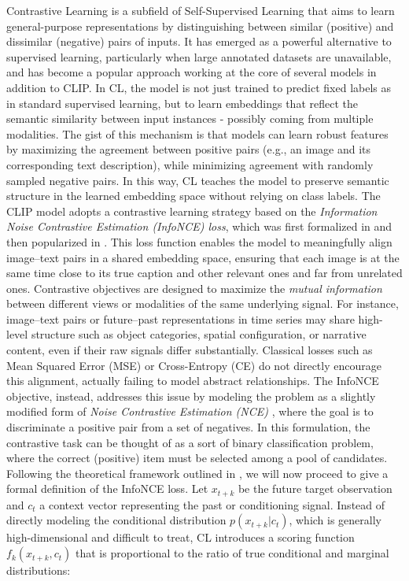 \documentclass[a4paper, twoside, english]{sapthesis} %
\begin{document}
Contrastive Learning is a subfield of Self-Supervised Learning that aims to learn general-purpose representations by distinguishing between similar (positive) and dissimilar (negative) pairs of inputs. It has emerged as a powerful alternative to supervised learning, particularly when large annotated datasets are unavailable, and has become a popular approach working at the core of several models in addition to CLIP. In CL, the model is not just trained to predict fixed labels as in standard supervised learning, but to learn embeddings that reflect the semantic similarity between input instances - possibly coming from multiple modalities.
The gist of this mechanism is that models can learn robust features by maximizing the agreement between positive pairs (e.g., an image and its corresponding text description), while minimizing agreement with randomly sampled negative pairs. In this way, CL teaches the model to preserve semantic structure in the learned embedding space without relying on class labels. 
The CLIP model adopts a contrastive learning strategy based on the \emph{Information Noise Contrastive Estimation (InfoNCE) loss}, which was first formalized in \cite{sohn2016improved} and then popularized in \cite{oord2018representation}. This loss function enables the model to meaningfully align image–text pairs in a shared embedding space, ensuring that each image is at the same time close to its true caption and other relevant ones and far from unrelated ones.
Contrastive objectives are designed to maximize the \emph{mutual information} between different views or modalities of the same underlying signal. For instance, image–text pairs or future–past representations in time series may share high-level structure such as object categories, spatial configuration, or narrative content, even if their raw signals differ substantially. Classical losses such as Mean Squared Error (MSE) or Cross-Entropy (CE) do not directly encourage this alignment, actually failing to model abstract relationships.
The InfoNCE objective, instead, addresses this issue by modeling the problem as a slightly modified form of \emph{Noise Contrastive Estimation (NCE)} \cite{gutmann2010noise} \cite{mnih2012fast} \cite{jozefowicz2016exploring}, where the goal is to discriminate a positive pair from a set of negatives. In this formulation, the contrastive task can be thought of as a sort of binary classification problem, where the correct (positive) item must be selected among a pool of candidates.
Following the theoretical framework outlined in \cite{oord2018representation}, we will now proceed to give a formal definition of the InfoNCE loss. Let $x_{t+k}$ be the future target observation and $c_t$ a context vector representing the past or conditioning signal. Instead of directly modeling the conditional distribution $p(x_{t+k} | c_t)$, which is generally high-dimensional and difficult to treat, CL introduces a scoring function $f_k(x_{t+k}, c_t)$ that is proportional to the ratio of true conditional and marginal distributions:
\end{document}
